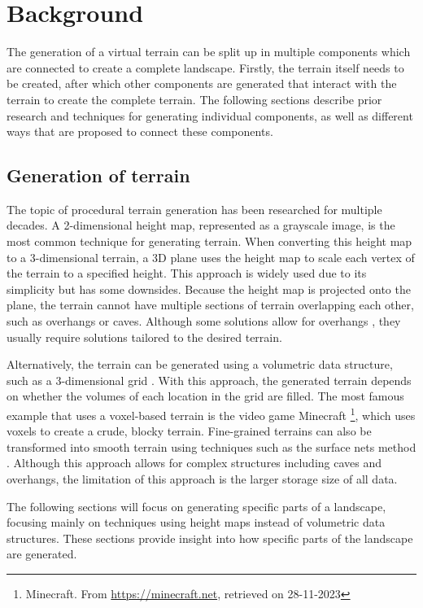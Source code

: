 \documentclass{article}
\begin{document}
\section{Background}
The generation of a virtual terrain can be split up in multiple components which are connected to create a complete landscape. Firstly, the terrain itself needs to be created, after which other components are generated that interact with the terrain to create the complete terrain. The following sections describe prior research and techniques for generating individual components, as well as different ways that are proposed to connect these components.

\subsection{Generation of terrain}
The topic of procedural terrain generation has been researched for multiple decades. A 2-dimensional height map, represented as a grayscale image, is the most common technique for generating terrain. When converting this height map to a 3-dimensional terrain, a 3D plane uses the height map to scale each vertex of the terrain to a specified height. This approach is widely used due to its simplicity but has some downsides. Because the height map is projected onto the plane, the terrain cannot have multiple sections of terrain overlapping each other, such as overhangs or caves. Although some solutions allow for overhangs \cite{gamito_procedural_2003}, they usually require solutions tailored to the desired terrain.

Alternatively, the terrain can be generated using a volumetric data structure, such as a 3-dimensional grid \cite{dey_procedural_2018}. With this approach, the generated terrain depends on whether the volumes of each location in the grid are filled. The most famous example that uses a voxel-based terrain is the video game Minecraft \footnote{Minecraft. From \url{https://minecraft.net}, retrieved on 28-11-2023}, which uses voxels to create a crude, blocky terrain. Fine-grained terrains can also be transformed into smooth terrain using techniques such as the surface nets method \cite{gibson_constrained_1998}. Although this approach allows for complex structures including caves \cite{cui_voxel-based_2011} and overhangs, the limitation of this approach is the larger storage size of all data.

The following sections will focus on generating specific parts of a landscape, focusing mainly on techniques using height maps instead of volumetric data structures. These sections provide insight into how specific parts of the landscape are generated.
\end{document}
